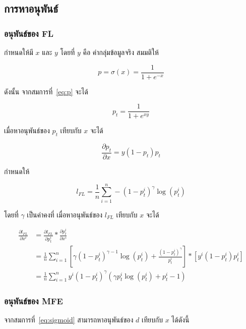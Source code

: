 \subsection{การหาอนุพันธ์}

\subsubsection{อนุพันธ์ของ FL}
กำหนดให้มี $x$ และ $y$ โดยที่ $y$ คือ ค่ากลุ่มข้อมูลจริง สมมติให้

\begin{equation}
	p = \sigma (x) = \frac{1}{1 + e^{-x}}
\end{equation}

ดังนั้น จากสมการที่~\ref{eq:p} จะได้

\begin{equation}
	p_{t} = \frac{1}{1 + e^{xy}}
\end{equation}

เมื่อหาอนุพันธ์ของ $p_{t}$ เทียบกับ $x$ จะได้

\begin{equation}
\frac{\partial p_{t}}{\partial x} = y(1 - p_{t})p_{t}
\end{equation}

กำหนดให้

\begin{equation}
    l_{FL} = \frac{1}{n} \sum_{i = 1}^{n} - (1 - p_{t}^{i})^{\gamma}\log (p_{t}^{i})
\end{equation}

โดยที่ $\gamma$ เป็นค่าคงที่ เมื่อหาอนุพันธ์ของ $l_{FL}$ เทียบกับ $x$ จะได้

\begin{equation}
\begin{split}
\frac{\partial l_{FL}}{\partial x^{i}} & = \frac{\partial l_{FL}}{\partial p_{t}^{i}} * \frac{\partial p_{t}^{i}}{\partial x^{i}} \\
& =\frac{1}{n} \sum_{i = 1}^{n} [\gamma (1 - p_{t}^{i})^{\gamma - 1} \log (p_{t}^{i}) + \frac{(1 - p_{t}^{i})^{\gamma}}{p_{t}^{i}}] * [y^{i}(1 - p_{t}^{i})p_{t}^{i}]  \\
& = \frac{1}{n} \sum_{i = 1}^{n} y^{i} (1 - p_{t}^{i})^{\gamma} (\gamma p_{t}^{i} \log (p_{t}^{i}) + p_{t}^{i} - 1)
\end{split}
\end{equation}

\subsubsection{อนุพันธ์ของ MFE}
จากสมการที่~\ref{eq:sigmoid} สามารถหาอนุพันธ์ของ $d$ เทียบกับ $x$ ได้ดังนี้

